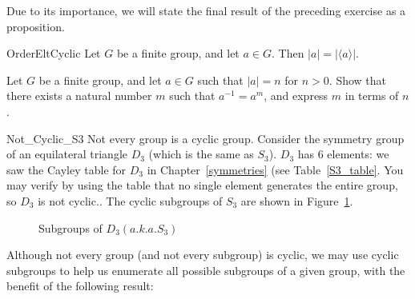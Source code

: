 Due to its importance, we will state the final result of the preceding exercise as a proposition.

\begin{prop}{OrderEltCyclic}
Let $G$ be a finite group, and let $a \in G$.  Then $|a|=| \langle a \rangle |$.
\end{prop}

\begin{exercise}{97}
Let $G$ be a finite group, and let $a \in G$ such that $|a| = n$ for $n>0$. Show that there exists a natural number $m$ such that $a^{-1} = a^m$, and express $m$ in terms of $n$.
\end{exercise}

 
\begin{example}{Not_Cyclic_S3}
Not every group is a cyclic group.  Consider the symmetry group of an
equilateral triangle $D_3$ (which is the same as $S_3$).  $D_3$ has 6 elements: we saw the Cayley table for $D_3$ in Chapter~\ref{symmetries} (see Table~\ref{S3_table}.  You may verify by using the table that no single element generates the entire group, so $D_3$ is not cyclic..
The cyclic subgroups of $S_3$ are shown in
Figure~\ref{subgrpsS3}. 
\hspace*{1in}
\end{example}

\begin{figure}[htb] %
\begin{center}
\end{center}
\caption{Subgroups of $D_3 (a.k.a. S_3)$}
\label{subgrpsS3}
\end{figure}

Although not every group  (and not every subgroup) is cyclic, we may use cyclic subgroups to help us
enumerate all possible subgroups of a given group, with the benefit of the following result:


